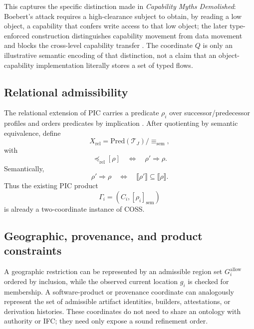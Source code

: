 \documentclass[10pt,twocolumn]{article}
\newcommand{\Model}{\textnormal{\textsc{COSS}}\xspace}
\newcommand{\sem}[1]{\llbracket #1 \rrbracket}
\begin{document}
This captures the specific distinction made in \emph{Capability Myths
Demolished}: Boebert's attack requires a high-clearance subject to obtain, by
reading a low object, a capability that confers write access to that low object;
the later type-enforced construction distinguishes capability movement from
data movement and blocks the cross-level capability transfer
\cite{miller_yee_shapiro2003}.  The coordinate $Q$ is only an illustrative
semantic encoding of that distinction, not a claim that an object-capability
implementation literally stores a set of typed flows.

\subsection{Relational admissibility}

The relational extension of PIC carries a predicate $\rho_i$ over
successor/predecessor profiles and orders predicates by implication
\cite{gallo_relational2026}.  After quotienting by semantic equivalence, define
\begin{equation}
  X_{\mathrm{rel}}
  =\mathrm{Pred}(\mathcal{T}_J)/{\equiv_{\mathrm{sem}}},
\end{equation}
with
\begin{equation}
  [\rho']\preceq_{\mathrm{rel}}[\rho]
  \quad\Longleftrightarrow\quad
  \rho'\Rightarrow\rho.
\end{equation}
Semantically,
\begin{equation}
  \rho'\Rightarrow\rho
  \quad\Longleftrightarrow\quad
  \sem{\rho'}\subseteq\sem{\rho}.
\end{equation}
Thus the existing PIC product
\begin{equation}
  \Gamma_i=(C_i,[\rho_i]_{\mathrm{sem}})
\end{equation}
is already a two-coordinate instance of \Model.

\subsection{Geographic, provenance, and product constraints}

A geographic restriction can be represented by an admissible region set
$G_i^{\mathrm{allow}}$ ordered by inclusion, while the observed current
location $g_i$ is checked for membership.  A software-product or provenance
coordinate can analogously represent the set of admissible artifact identities,
builders, attestations, or derivation histories.  These coordinates do not need
to share an ontology with authority or IFC; they need only expose a sound
refinement order.
\end{document}
